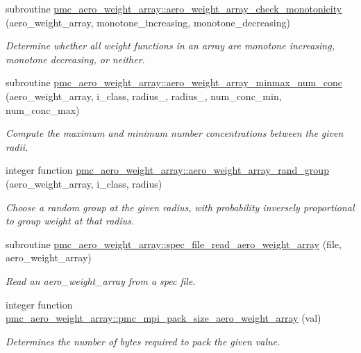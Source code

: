 \begin{DoxyCompactItemize}
subroutine \mbox{\hyperlink{namespacepmc__aero__weight__array_aad4535065f56a39ce8da5717f0c334fd}{pmc\+\_\+aero\+\_\+weight\+\_\+array\+::aero\+\_\+weight\+\_\+array\+\_\+check\+\_\+monotonicity}} (aero\+\_\+weight\+\_\+array, monotone\+\_\+increasing, monotone\+\_\+decreasing)
\begin{DoxyCompactList}\small\item\em Determine whether all weight functions in an array are monotone increasing, monotone decreasing, or neither. \end{DoxyCompactList}\item 
subroutine \mbox{\hyperlink{namespacepmc__aero__weight__array_a3a1055fc4a1be729c0b32fc114ddffd2}{pmc\+\_\+aero\+\_\+weight\+\_\+array\+::aero\+\_\+weight\+\_\+array\+\_\+minmax\+\_\+num\+\_\+conc}} (aero\+\_\+weight\+\_\+array, i\+\_\+class, radius\+\_, radius\+\_, num\+\_\+conc\+\_\+min, num\+\_\+conc\+\_\+max)
\begin{DoxyCompactList}\small\item\em Compute the maximum and minimum number concentrations between the given radii. \end{DoxyCompactList}\item 
integer function \mbox{\hyperlink{namespacepmc__aero__weight__array_a0a5faf6c66a3b2e8bddd70ac19db2927}{pmc\+\_\+aero\+\_\+weight\+\_\+array\+::aero\+\_\+weight\+\_\+array\+\_\+rand\+\_\+group}} (aero\+\_\+weight\+\_\+array, i\+\_\+class, radius)
\begin{DoxyCompactList}\small\item\em Choose a random group at the given radius, with probability inversely proportional to group weight at that radius. \end{DoxyCompactList}\item 
subroutine \mbox{\hyperlink{namespacepmc__aero__weight__array_a9bc50db61d65311b62b7bae73bf7c917}{pmc\+\_\+aero\+\_\+weight\+\_\+array\+::spec\+\_\+file\+\_\+read\+\_\+aero\+\_\+weight\+\_\+array}} (file, aero\+\_\+weight\+\_\+array)
\begin{DoxyCompactList}\small\item\em Read an aero\+\_\+weight\+\_\+array from a spec file. \end{DoxyCompactList}\item 
integer function \mbox{\hyperlink{namespacepmc__aero__weight__array_a1fe03c483b391b7fa2d7201b3868f9b8}{pmc\+\_\+aero\+\_\+weight\+\_\+array\+::pmc\+\_\+mpi\+\_\+pack\+\_\+size\+\_\+aero\+\_\+weight\+\_\+array}} (val)
\begin{DoxyCompactList}\small\item\em Determines the number of bytes required to pack the given value. \end{DoxyCompactList}\item 

\end{DoxyCompactItemize}
